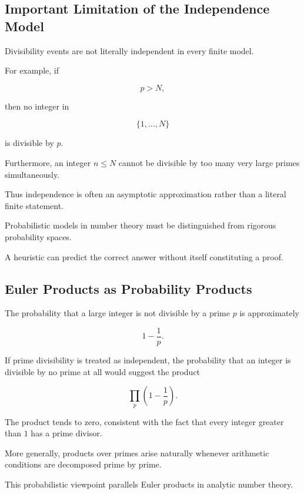 \subsection{Important Limitation of the Independence Model}
\label{subsec:independence-model-limitation}

Divisibility events are not literally independent in every finite model.

For example, if

\[ p>N, \]

then no integer in

\[ \{1,\ldots,N\} \]

is divisible by \(p\).

Furthermore, an integer \(n\leq N\) cannot be divisible by too many very
large primes simultaneously.

Thus independence is often an asymptotic approximation rather than a literal
finite statement.

\begin{warningbox}
Probabilistic models in number theory must be distinguished from rigorous
probability spaces.

A heuristic can predict the correct answer without itself constituting a
proof.
\end{warningbox}

\subsection{Euler Products as Probability Products}
\label{subsec:euler-products-probability}

The probability that a large integer is not divisible by a prime \(p\) is
approximately

\[ 1-\frac1p. \]

If prime divisibility is treated as independent, the probability that an
integer is divisible by no prime at all would suggest the product

\[ \prod_p\left(1-\frac1p\right). \]

The product tends to zero, consistent with the fact that every integer
greater than \(1\) has a prime divisor.

More generally, products over primes arise naturally whenever arithmetic
conditions are decomposed prime by prime.

This probabilistic viewpoint parallels Euler products in analytic number
theory.

